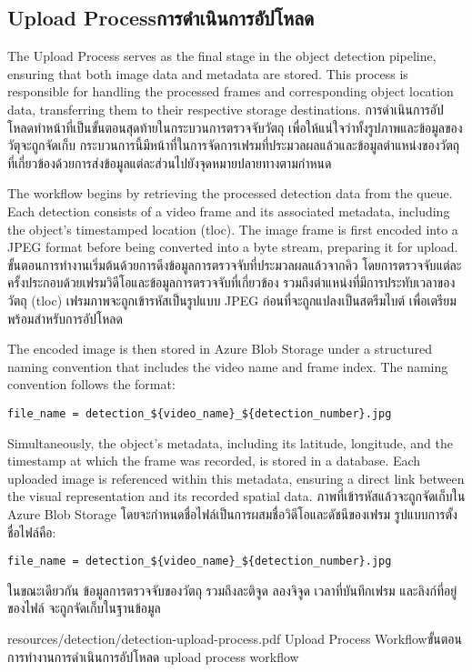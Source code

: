 \subsection{\ifenglish Upload Process\else การดำเนินการอัปโหลด\fi}
\ifenglish
The Upload Process serves as the final stage in the object detection pipeline, ensuring that both image data and metadata are stored. This process is responsible for handling the processed frames and corresponding object location data, transferring them to their respective storage destinations.
\else
การดำเนินการอัปโหลดทำหน้าที่เป็นขั้นตอนสุดท้ายในกระบวนการตรวจจับวัตถุ เพื่อให้แน่ใจว่าทั้งรูปภาพและข้อมูลของวัตุจะถูกจัดเก็บ กระบวนการนี้มีหน้าที่ในการจัดการเฟรมที่ประมวลผลแล้วและข้อมูลตำแหน่งของวัตถุที่เกี่ยวข้องด้วยการส่งข้อมูลแต่ละส่วนไปยังจุดหมายปลายทางตามกำหนด
\fi

\ifenglish
The workflow begins by retrieving the processed detection data from the queue. Each detection consists of a video frame and its associated metadata, including the object's timestamped location (tloc). The image frame is first encoded into a JPEG format before being converted into a byte stream, preparing it for upload.
\else
ขั้นตอนการทำงานเริ่มต้นด้วยการดึงข้อมูลการตรวจจับที่ประมวลผลแล้วจากคิว โดยการตรวจจับแต่ละครั้งประกอบด้วยเฟรมวิดีโอและข้อมูลการตรวจจับที่เกี่ยวข้อง รวมถึงตำแหน่งที่มีการประทับเวลาของวัตถุ (tloc) เฟรมภาพจะถูกเข้ารหัสเป็นรูปแบบ JPEG ก่อนที่จะถูกแปลงเป็นสตรีมไบต์ เพื่อเตรียมพร้อมสำหรับการอัปโหลด
\fi

\ifenglish
The encoded image is then stored in Azure Blob Storage under a structured naming convention that includes the video name and frame index. The naming convention follows the format: 
\begin{lstlisting}
file_name = detection_${video_name}_${detection_number}.jpg
\end{lstlisting}
Simultaneously, the object's metadata, including its latitude, longitude, and the timestamp at which the frame was recorded, is stored in a database. Each uploaded image is referenced within this metadata, ensuring a direct link between the visual representation and its recorded spatial data.
\else
ภาพที่เข้ารหัสแล้วจะถูกจัดเก็บใน Azure Blob Storage โดยจะกำหนดชื่อไฟล์เป็นการผสมชื่อวิดีโอและดัชนีของเฟรม รูปแบบการตั้งชื่อไฟล์คือ:
\begin{lstlisting}
file_name = detection_${video_name}_${detection_number}.jpg
\end{lstlisting}
ในขณะเดียวกัน ข้อมูลการตรวจจับของวัตถุ รวมถึงละติจูด ลองจิจูด เวลาที่บันทึกเฟรม และลิงก์ที่อยู่ของไฟล์ จะถูกจัดเก็บในฐานข้อมูล 
\fi

\insertPDFfigure
{resources/detection/detection-upload-process.pdf}
{\ifenglish Upload Process Workflow\else ขั้นตอนการทำงานการดำเนินการอัปโหลด\fi}
{upload process workflow}